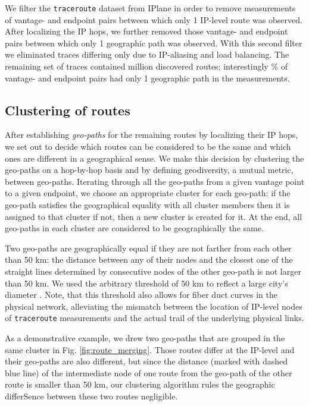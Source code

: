 \documentclass[peerreview]{IEEEtran}
\begin{document}
We filter the \texttt{traceroute} dataset from IPlane in order to remove
measurements of vantage- and endpoint pairs between which only 1 IP-level route
was observed. After localizing the IP hops, we further removed those vantage-
and endpoint pairs between which only 1 geographic path was observed. With this
second filter we eliminated traces differing only due to IP-aliasing and load
balancing. The remaining set of traces contained  million discovered
routes; interestingly \% of vantage- and endpoint pairs had only 1
geographic path in the measurements.

\subsection{Clustering of routes}
\label{sec:geodiverse-routes}

After establishing \textit{geo-paths} for the remaining routes by localizing
their IP hops, we set out to decide which routes can be considered to be the
same and which ones are different in a geographical sense. We make this decision
by clustering the geo-paths on a hop-by-hop basis and by defining geodiversity,
a mutual metric, between geo-paths. Iterating through all the geo-paths from a
given vantage point to a given endpoint, we choose an appropriate cluster for
each geo-path: if the geo-path satisfies the geographical equality with all
cluster members then it is assigned to that cluster if not, then a new cluster
is created for it. At the end, all geo-paths in each cluster are considered to
be geographically the same.

Two geo-paths are geographically equal if they are not farther from each other
than 50 km: the distance between any of their nodes and the closest one of the
straight lines determined by consecutive nodes of the other geo-path is not
larger than 50 km. We used the arbitrary threshold of 50 km to reflect a large
city's diameter \cite{geoloc_db}. Note, that this threshold also allows for
fiber duct curves in the physical network, alleviating the mismatch between the
location of IP-level nodes of \texttt{traceroute} measurements and the actual
trail of the underlying physical links.

As a demonstrative example, we drew two geo-paths that are grouped in the same
cluster in Fig. \ref{fig:route_merging}. Those routes differ at the IP-level and
their geo-paths are also different, but since the distance (marked with dashed
blue line) of the intermediate node of one route from the geo-path of the other
route is smaller than 50 km, our clustering algorithm rules the geographic
differSence between these two routes negligible.
\end{document}
